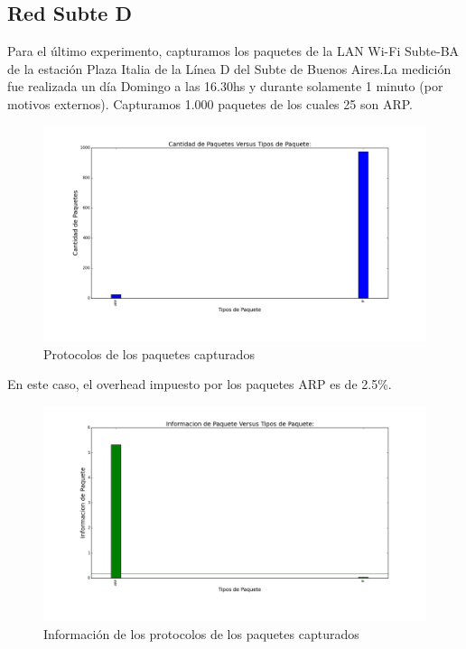 \subsection{Red Subte D}

Para el último experimento, capturamos los paquetes de la LAN Wi-Fi Subte-BA de la estación Plaza Italia de la Línea D del Subte de Buenos Aires.La medición fue realizada un día Domingo a las 16.30hs y durante solamente 1 minuto (por motivos externos). Capturamos 1.000 paquetes de los cuales 25 son ARP.

\begin{figure}[H]
       \centering
       \includegraphics[width=1\textwidth]{../resultados/subte/histogram_types.png}
       \caption{Protocolos de los paquetes capturados}
       \label{red-Starbucks-types}
\end{figure}

En este caso, el overhead impuesto por los paquetes ARP es de 2.5\%.

\begin{figure}[H]
       \centering
       \includegraphics[width=1\textwidth]{../resultados/subte/histogram_types_information.png}
       \caption{Información de los protocolos de los paquetes capturados}
       \label{red-Starbucks-types-information}
\end{figure}

